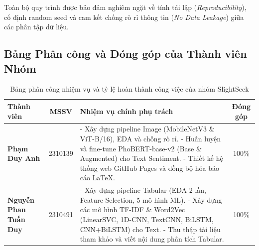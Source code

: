 \documentclass[a4paper,11pt]{article}
\begin{document}
Toàn bộ quy trình được bảo đảm nghiêm ngặt về tính tái lập (\textit{Reproducibility}), cố định random seed và cam kết chống rò rỉ thông tin (\textit{No Data Leakage}) giữa các phân tập dữ liệu.

\subsection{Bảng Phân công và Đóng góp của Thành viên Nhóm}
\begin{table}[H]
\centering
\caption{Bảng phân công nhiệm vụ và tỷ lệ hoàn thành công việc của nhóm SlightSeek}
\begin{tabularx}{\textwidth}{p{4cm} c X c}
\toprule
\textbf{Thành viên} & \textbf{MSSV} & \textbf{Nhiệm vụ chính phụ trách} & \textbf{Đóng góp} \\
\midrule
\textbf{Phạm Duy Anh} & 2310139 & 
- Xây dựng pipeline Image (MobileNetV3 \& ViT-B/16), EDA và chống rò rỉ. \newline
- Huấn luyện và fine-tune PhoBERT-base-v2 (Base \& Augmented) cho Text Sentiment. \newline
- Thiết kế hệ thống web GitHub Pages và đồng bộ hóa báo cáo LaTeX. & 100\% \\
\midrule
\textbf{Nguyễn Phan Tuấn Duy} & 2310491 & 
- Xây dựng pipeline Tabular (EDA 2 lần, Feature Selection, 5 mô hình ML). \newline
- Xây dựng các mô hình TF-IDF \& Word2Vec (LinearSVC, 1D-CNN, TextCNN, BiLSTM, CNN+BiLSTM) cho Text. \newline
- Thu thập tài liệu tham khảo và viết nội dung phân tích Tabular. & 100\% \\
\bottomrule
\end{tabularx}
\end{table}

\newpage


\end{document}
